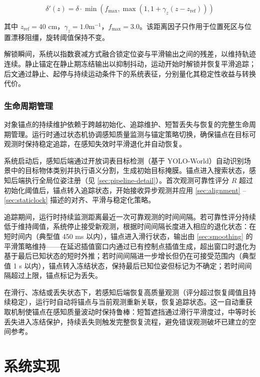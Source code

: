 \documentclass[review]{vgtc}
\begin{document}
\begin{equation}
\delta'(z) = \delta \cdot \min\!\left(f_{\mathrm{max}}, \max\!\left(1, 1 + \gamma_z (z - z_{\mathrm{ref}})\right)\right)
\label{eq:distance-adaptive}
\end{equation}


其中 $z_{\mathrm{ref}} = 40$ cm，$\gamma_z = 1.0 \mathrm{m}^{-1}$，$f_{\mathrm{max}} = 3.0$。该距离因子只作用于位置死区与位置漂移阻缰，旋转阈值保持不变。

解锁瞬间，系统以指数衰减方式融合锁定位姿与平滑输出之间的残差，以维持轨迹连续。静止锚定在静止期冻结输出以抑制抖动，运动开始时解锁并恢复平滑追踪；后文通过静止、起停与持续运动条件下的系统表征，分别量化其稳定性收益与转换代价。

\subsubsection{生命周期管理}\label{sec:lifecycle}


对象锚点的持续维护依赖于跨越初始化、追踪维护、短暂丢失与恢复的完整生命周期管理。运行时通过状态机协调感知质量监测与锚定策略切换，确保锚点在目标可观测时保持稳定追踪，在感知失效时平滑退化并自动恢复。

系统启动后，感知后端通过开放词表目标检测（基于 YOLO-World）自动识别场景中的目标物体类别并执行语义分割，生成初始目标掩膜。锚点进入搜索状态，感知后端执行全局位姿注册（见 \ref{sec:pipeline-detail}）。首次观测可靠性评分 $R$ 超过初始化阈值后，锚点转入追踪状态，开始接收异步观测并应用 \ref{sec:alignment} -- \ref{sec:staticlock} 描述的对齐、平滑与稳定化策略。

追踪期间，运行时持续监测距离最近一次可靠观测的时间间隔。若可靠性评分持续低于维持阈值，系统停止接受新观测，根据时间间隔长度进入相应的退化状态：在短时间内（典型值 450 ms 以内），锚点进入滑行状态，输出由 \ref{sec:smoothing} 的平滑策略维持------在延迟插值窗口内通过已有控制点插值生成，超出窗口时退化为基于最后已知状态的短时外推；若时间间隔进一步增长但仍在可接受范围内（典型值 1 s 以内），锚点转入冻结状态，保持最后已知位姿但标记为不确定；若时间间隔超过上限，锚点标记为丢失。

在滑行、冻结或丢失状态下，若感知后端恢复高质量观测（评分超过恢复阈值且持续稳定），运行时自动将锚点与当前观测重新关联，恢复追踪状态。这一自动重获取机制使锚点在感知质量波动时保持鲁棒：短暂遮挡通过滑行平滑度过，中等时长丢失进入冻结保护，持续丢失则触发完整恢复流程，避免错误观测破坏已建立的空间参考。

\section{系统实现}\label{sec:impl}
\end{document}
